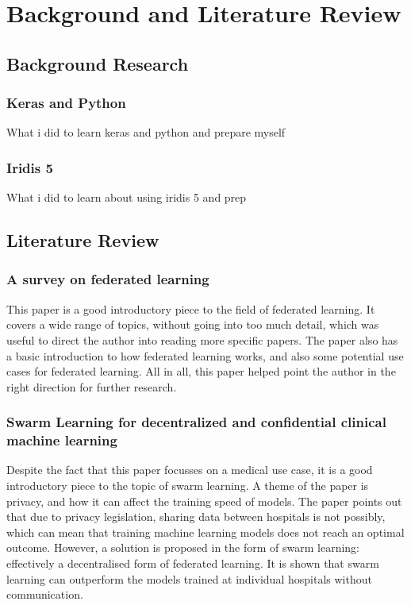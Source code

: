 \chapter{Background and Literature Review}
\section{Background Research}
\subsection{Keras and Python}
What i did to learn keras and python and prepare myself
\subsection{Iridis 5}
What i did to learn about using iridis 5 and prep
\section{Literature Review}
\subsection{A survey on federated learning \cite{survey_on_fed_learning}}
This paper is a good introductory piece to the field of federated learning. It covers a wide range of topics, without going into too much detail, which was useful to direct the author into reading more specific papers. The paper also has a basic introduction to how federated learning works, and also some potential use cases for federated learning. All in all, this paper helped point the author in the right direction for further research.

\subsection{Swarm Learning for decentralized and confidential clinical machine learning \cite{swarm_learning}}
Despite the fact that this paper focusses on a medical use case, it is a good introductory piece to the topic of swarm learning. A theme of the paper is privacy, and how it can affect the training speed of models. The paper points out that due to privacy legislation, sharing data between hospitals is not possibly, which can mean that training machine learning models does not reach an optimal outcome. However, a solution is proposed in the form of swarm learning: effectively a decentralised form of federated learning. It is shown that swarm learning can outperform the models trained at individual hospitals without communication.

